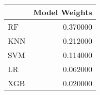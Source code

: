 \begin{tabular}{lr}
\toprule
 & Model Weights \\
\midrule
RF & 0.370000 \\
KNN & 0.212000 \\
SVM & 0.114000 \\
LR & 0.062000 \\
XGB & 0.020000 \\
\bottomrule
\end{tabular}

